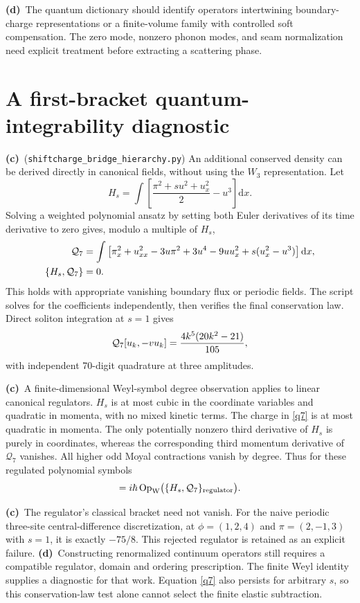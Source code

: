 \documentclass[11pt,a4paper]{article}
\newcommand{\C}{\textbf{(c)}\ }
\newcommand{\D}{\textbf{(d)}\ }
\newcommand{\dd}{\mathrm d}
\newcommand{\file}[1]{\nolinkurl{#1}}
\newcommand{\hy}{\file{shiftcharge_bridge_hierarchy.py}}
\begin{document}
\D The quantum dictionary should identify operators intertwining
boundary-charge representations or a finite-volume family with controlled
soft compensation. The zero mode, nonzero phonon modes, and seam
normalization need explicit treatment before extracting a scattering phase.

\section{A first-bracket quantum-integrability diagnostic}
\C (\hy) An additional conserved density can be derived directly
in canonical fields, without using the $W_3$ representation. Let
\begin{equation}
 H_s=\int\left[\frac{\pi^2+s u^2+u_x^2}{2}-u^3\right]\dd x .
\end{equation}
Solving a weighted polynomial ansatz by setting both Euler derivatives of
its time derivative to zero gives, modulo a multiple of $H_s$,
\begin{align}
 {\cal Q}_7&=\int\left[
 \pi_x^2+u_{xx}^2-3u\pi^2+3u^4-9u u_x^2
 +s(u_x^2-u^3)\right]\dd x,\nonumber\\
 \{H_s,{\cal Q}_7\}&=0 .
 \label{q7}
\end{align}
This holds with appropriate vanishing boundary flux or periodic fields.
The script solves for the coefficients independently, then verifies
the final conservation law. Direct soliton integration at $s=1$ gives
\begin{equation}
 {\cal Q}_7[u_k,-vu_k]=\frac{4k^5(20k^2-21)}{105},
 \label{q7sol}
\end{equation}
with independent 70-digit quadrature at three amplitudes.

\C A finite-dimensional Weyl-symbol degree observation applies to
linear canonical regulators. $H_s$ is at most cubic in the coordinate
variables and quadratic in momenta, with no mixed kinetic terms.
The charge in \eqref{q7} is at most quadratic in momenta.
The only potentially nonzero third derivative of $H_s$ is purely in
coordinates, whereas the corresponding third momentum derivative of
$\mathcal Q_7$ vanishes. All higher odd Moyal contractions vanish by degree.
Thus for these regulated polynomial symbols
\begin{equation}
 [\operatorname{Op}_{\rm W}(H_s),
   \operatorname{Op}_{\rm W}({\cal Q}_7)]
 =i\hbar\operatorname{Op}_{\rm W}
   \bigl(\{H_s,{\cal Q}_7\}_{\rm regulator}\bigr).
 \label{weyl}
\end{equation}

\C The regulator's classical bracket need not vanish.
For the naive periodic three-site central-difference discretization,
at $\phi=(1,2,4)$ and $\pi=(2,-1,3)$ with $s=1$, it is exactly
$-75/8$. This rejected regulator is retained as an explicit failure.
\D Constructing renormalized continuum operators still requires a
compatible regulator, domain and ordering prescription. The finite
Weyl identity supplies a diagnostic for that work. Equation \eqref{q7}
also persists for arbitrary $s$, so this conservation-law test alone
cannot select the finite elastic subtraction.
\end{document}
